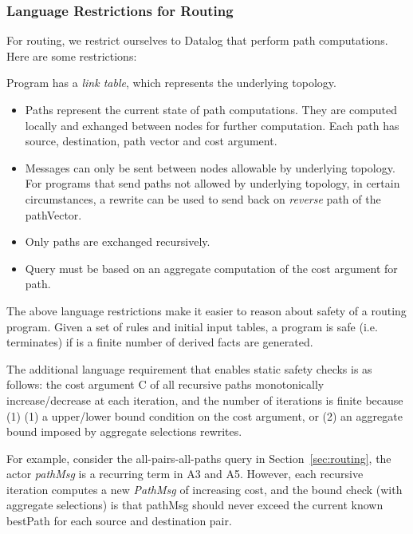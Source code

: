 \documentclass{article}
\begin{document}
\subsubsection{Language Restrictions for Routing}

For routing, we restrict ourselves to Datalog that perform path
computations. Here are some restrictions:

Program has a {\em link table}, which represents the underlying
topology. 

\begin{itemize}
\item Paths represent the current state of path computations. They are
  computed locally and exhanged between nodes for further computation. Each path has source, destination, path vector and cost
  argument. 

\item Messages can only be sent between nodes allowable by
  underlying topology. For programs that send paths not allowed by
  underlying topology, in certain circumstances, a rewrite can be used to send back on {\em
  reverse} path of the pathVector.

\item Only paths are exchanged recursively.

\item Query must be based on an aggregate computation of the cost
  argument for path.

\end{itemize}

The above language restrictions make it easier to reason about safety of
a routing program.  Given a set of rules and initial input tables, a program is safe
(i.e. terminates) if is a finite number of derived facts are
generated. 

The additional language requirement that enables static safety checks is
as follows: the cost argument C of all recursive paths monotonically
increase/decrease at each iteration, and the number of iterations is
finite because (1) (1) a upper/lower bound condition on the cost argument, or (2) an aggregate bound imposed by aggregate
selections rewrites.

For example, consider the all-pairs-all-paths query in
Section~\ref{sec:routing}, the actor {\em pathMsg} is a recurring term
in A3 and A5. However, each recursive iteration computes a new {\em
  PathMsg} of increasing cost, and the bound check (with aggregate
selections) is that pathMsg
should never exceed the current known bestPath for each source and
destination pair.
\end{document}
